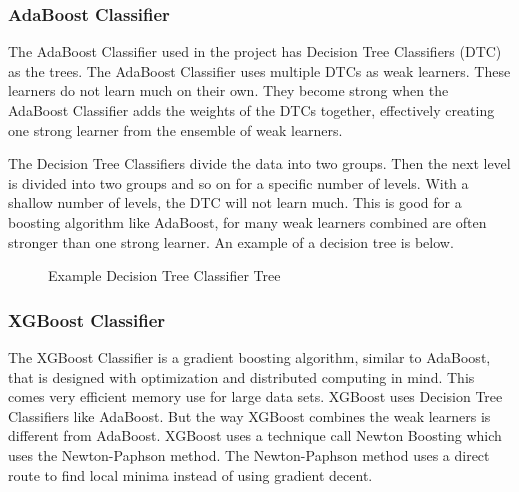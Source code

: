 \documentclass{article}
\begin{document}
\subsubsection{AdaBoost Classifier}
\par
The AdaBoost Classifier used in the project has Decision Tree Classifiers (DTC) as the trees. The AdaBoost Classifier uses multiple DTCs as weak learners. These learners do not learn much on their own. They become strong when the AdaBoost Classifier adds the weights of the DTCs together, effectively creating one strong learner from the ensemble of weak learners.
\par
The Decision Tree Classifiers divide the data into two groups. Then the next level is divided into two groups and so on for a specific number of levels. With a shallow number of levels, the DTC will not learn much. This is good for a boosting algorithm like AdaBoost, for many weak learners combined are often stronger than one strong learner. An example of a decision tree is below.

\begin{figure}[H]
    \centering
    \caption{Example Decision Tree Classifier Tree}
    \label{fig:tree}
\end{figure}

\subsubsection{XGBoost Classifier}
\par
The XGBoost Classifier is a gradient boosting algorithm, similar to AdaBoost, that is designed with optimization and distributed computing in mind. This comes very efficient memory use for large data sets. XGBoost uses Decision Tree Classifiers like AdaBoost. But the way XGBoost combines the weak learners is different from AdaBoost. XGBoost uses a technique call Newton Boosting which uses the Newton-Paphson method. The Newton-Paphson method uses a direct route to find local minima instead of using gradient decent.
\end{document}
